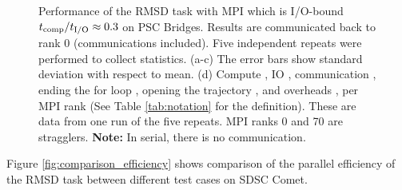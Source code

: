 \begin{figure}[ht!]
\caption{Performance of the RMSD task with MPI which is I/O-bound ${t}_{\text{comp}}/{t}_{\text{I/O}} \approx 0.3$ on PSC Bridges.
Results are communicated back to rank 0 (communications included). Five independent repeats were performed to collect statistics. (a-c) The error bars show
standard deviation with respect to mean. (d) Compute \tcomp, IO \tIO, communication \tcomm, ending the for loop ,
  opening the trajectory , and overheads ,  per MPI rank (See Table \ref{tab:notation} for the definition).
These are data from one run of the five repeats. MPI ranks 0 and 70 are stragglers. \textbf{Note:} In serial, there is no communication.}
\label{fig:MPIwithIO-Bridges}
\end{figure} 

Figure \ref{fig:comparison_efficiency} shows comparison of the parallel efficiency of the RMSD task between different test cases on SDSC Comet.  

